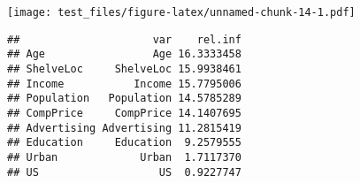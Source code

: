 \documentclass[
]{article}
\newenvironment{Shaded}{\begin{snugshade}}{\end{snugshade}}
\newcommand{\AttributeTok}[1]{\textcolor[rgb]{0.77,0.63,0.00}{#1}}
\newcommand{\DecValTok}[1]{\textcolor[rgb]{0.00,0.00,0.81}{#1}}
\newcommand{\FloatTok}[1]{\textcolor[rgb]{0.00,0.00,0.81}{#1}}
\newcommand{\FunctionTok}[1]{\textcolor[rgb]{0.00,0.00,0.00}{#1}}
\newcommand{\NormalTok}[1]{#1}
\newcommand{\OtherTok}[1]{\textcolor[rgb]{0.56,0.35,0.01}{#1}}
\newcommand{\SpecialCharTok}[1]{\textcolor[rgb]{0.00,0.00,0.00}{#1}}
\newcommand{\StringTok}[1]{\textcolor[rgb]{0.31,0.60,0.02}{#1}}
\begin{document}
\begin{Shaded}
\end{Shaded}

\texttt{[image: test\_files/figure-latex/unnamed-chunk-14-1.pdf]}

\begin{verbatim}
##                     var    rel.inf
## Age                 Age 16.3333458
## ShelveLoc     ShelveLoc 15.9938461
## Income           Income 15.7795006
## Population   Population 14.5785289
## CompPrice     CompPrice 14.1407695
## Advertising Advertising 11.2815419
## Education     Education  9.2579555
## Urban             Urban  1.7117370
## US                   US  0.9227747
\end{verbatim}
\end{document}

